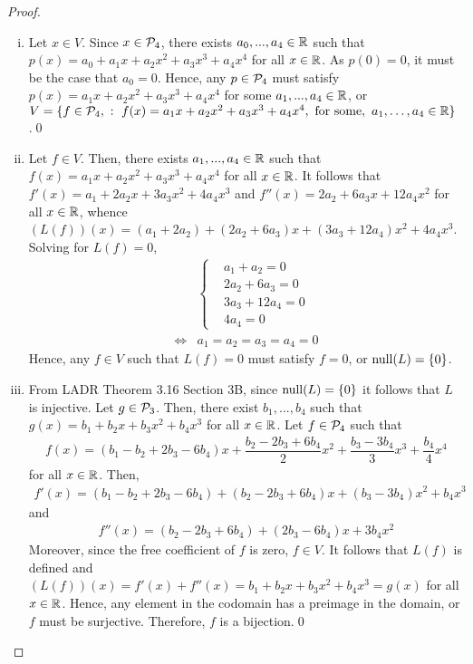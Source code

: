 \begin{proof}
    \renewcommand{\qedsymbol}{$\blacksquare$}
    \begin{enumerate}[(i)]
        \item Let $x\in V$. Since $x\in\P_4$, there exists $a_0,...,a_4\in\R$ such that $p(x)=a_0+a_1x+a_2x^2+a_3x^3+a_4x^4$ for all $x\in\R$.
        As $p(0)=0$, it must be the case that $a_0=0$. Hence, any $p\in\P_4$ must satisfy $p(x)=a_1x+a_2x^2+a_3x^3+a_4x^4$ for some $a_1,...,a_4\in\R$,
        or $V=\{f\in\P_4,\ :\ f(x) = a_1x + a_2x^2 +a_3x^3 + a_4 x^4,\ \text{for some},\ a_1,\dots,a_4 \in\real\}$.\qed
        \item Let $f\in V$. Then, there exists $a_1,...,a_4\in\R$ such that $f(x)=a_1x+a_2x^2+a_3x^3+a_4x^4$ for all $x\in\R$.
        It follows that $f'(x)=a_1+2a_2x+3a_3x^2+4a_4x^3$ and $f''(x)=2a_2+6a_3x+12a_4x^2$ for all $x\in\R$, whence $(L(f))(x)=(a_1+2a_2)+(2a_2+6a_3)x+(3a_3+12a_4)x^2+4a_4x^3$.
        Solving for $L(f)=0$,
        \begin{align*}
            &\begin{cases}
                &a_1+a_2=0\\
                &2a_2+6a_3=0\\
                &3a_3+12a_4=0\\
                &4a_4=0
            \end{cases}\\\iff
            &a_1=a_2=a_3=a_4=0
        \end{align*}
        Hence, any $f\in V$ such that $L(f)=0$ must satisfy $f=0$, or $\nullla(L)=\{0\}$.
        \item From LADR Theorem 3.16 Section 3B, since $\nullla(L)=\{0\}$ it follows that $L$ is injective.
        Let $g\in\P_3$. Then, there exist $b_1,...,b_4$ such that $g(x)=b_1+b_2x+b_3x^2+b_4x^3$ for all $x\in\R$.
        Let $f\in\P_4$ such that 
        \[
            \begin{aligned}
                f(x)=(b_1-b_2+2b_3-6b_4)x+\dfrac{b_2-2b_3+6b_4}{2}x^2+\dfrac{b_3-3b_4}{3}x^3+\dfrac{b_4}{4}x^4
            \end{aligned}
        \]
        for all $x\in\R$. Then, 
        \[
            \begin{aligned}
                f'(x)=(b_1-b_2+2b_3-6b_4)+(b_2-2b_3+6b_4)x+(b_3-3b_4)x^2+b_4x^3
            \end{aligned}
        \]
        and 
        \[
            \begin{aligned}
                f''(x)=(b_2-2b_3+6b_4)+(2b_3-6b_4)x+3b_4x^2
            \end{aligned}
        \]
        Moreover, since the free coefficient of $f$ is zero, $f\in V$.
        It follows that $L(f)$ is defined and $(L(f))(x)=f'(x)+f''(x)=b_1+b_2x+b_3x^2+b_4x^3=g(x)$ for all $x\in\R$.
        Hence, any element in the codomain has a preimage in the domain, or $f$ must be surjective.
        Therefore, $f$ is a bijection.\qed
        

\end{enumerate}
\end{proof}
